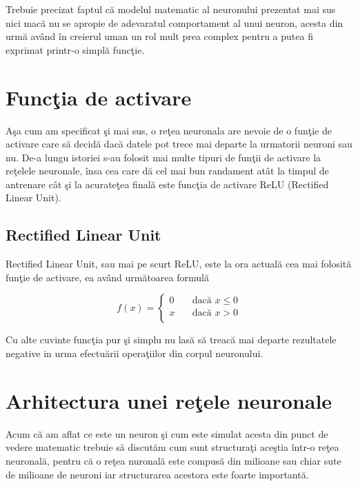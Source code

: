 \par

Trebuie precizat faptul c\u{a} modelul matematic al neuronului prezentat mai sus nici mac\u{a} nu se apropie de adevaratul comportament al unui neuron, acesta din urm\u{a} av\^{a}nd \^{i}n creierul uman un rol mult prea complex pentru a putea fi exprimat printr-o simpl\u{a} func\c{t}ie. 


\section{Func\c{t}ia de activare}

A\c{s}a cum am specificat \c{s}i mai sus, o re\c{t}ea neuronala are nevoie de o fun\c{t}ie de activare care s\u{a} decid\u{a} dac\u{a} datele pot trece mai departe la urmatorii neuroni sau nu. De-a lungu istoriei s-au folosit mai multe tipuri de fun\c{t}ii de activare la re\c{t}elele neuronale, \^{i}nsa cea care d\u{a} cel mai bun randament at\^{a}t la timpul de antrenare c\^{a}t \c{s}i la acurate\c{t}ea final\u{a} este func\c{t}ia de activare ReLU (Rectified Linear Unit).

\subsection{Rectified Linear Unit}

Rectified Linear Unit, sau mai pe scurt ReLU, este la ora actual\u{a} cea mai folosit\u{a} fun\c{t}ie de activare, ea av\^{a}nd urm\u{a}toarea formul\u{a}

\[ f(x) =
  \begin{cases}
    0       & \quad \text{dac\u{a} } x \leq 0\\
    x  & \quad \text{dac\u{a} } x > 0\\
  \end{cases}
\]

Cu alte cuvinte func\c{t}ia pur \c{s}i simplu nu las\u{a} s\u{a} treac\u{a} mai departe rezultatele negative in urma efectu\u{a}rii opera\c{t}iilor din corpul neuronului.

\section{Arhitectura unei re\c{t}ele neuronale}

Acum c\u{a} am aflat ce este un neuron \c{s}i cum este simulat acesta din punct de vedere matematic trebuie s\u{a} discut\u{a}m cum sunt structura\c{t}i ace\c{s}tia \^{i}ntr-o re\c{t}ea neuronal\u{a}, pentru c\u{a} o re\c{t}ea nuronal\u{a} este compus\u{a} din milioane sau chiar sute de milioane de neuroni iar structurarea acestora este foarte important\u{a}.

